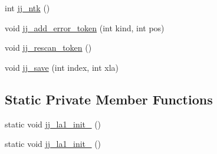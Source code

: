 \begin{DoxyCompactItemize}
\item 
int \hyperlink{classuk_1_1ac_1_1manchester_1_1cs_1_1owl_1_1owlapi_1_1turtle_1_1parser_1_1_turtle_parser_adb6c380d1bc82c2a440a9f7c1c100c7c}{jj\-\_\-ntk} ()
\item 
void \hyperlink{classuk_1_1ac_1_1manchester_1_1cs_1_1owl_1_1owlapi_1_1turtle_1_1parser_1_1_turtle_parser_a344c77321cbb082e5a7cc9f7ccb2f335}{jj\-\_\-add\-\_\-error\-\_\-token} (int kind, int pos)
\item 
void \hyperlink{classuk_1_1ac_1_1manchester_1_1cs_1_1owl_1_1owlapi_1_1turtle_1_1parser_1_1_turtle_parser_a1c81a4de97063594f6558495d9199bfc}{jj\-\_\-rescan\-\_\-token} ()
\item 
void \hyperlink{classuk_1_1ac_1_1manchester_1_1cs_1_1owl_1_1owlapi_1_1turtle_1_1parser_1_1_turtle_parser_af8fc363c196ddb8b764d6b9fb768e7e2}{jj\-\_\-save} (int index, int xla)
\end{DoxyCompactItemize}
\subsection*{Static Private Member Functions}
\begin{DoxyCompactItemize}
\item 
static void \hyperlink{classuk_1_1ac_1_1manchester_1_1cs_1_1owl_1_1owlapi_1_1turtle_1_1parser_1_1_turtle_parser_a7c9c3fa07c2092a6bdd578aa57b1f33f}{jj\-\_\-la1\-\_\-init\-\_} ()
\item 
static void \hyperlink{classuk_1_1ac_1_1manchester_1_1cs_1_1owl_1_1owlapi_1_1turtle_1_1parser_1_1_turtle_parser_adc148db78531c2280570f8f09c5b4864}{jj\-\_\-la1\-\_\-init\-\_} ()
\end{DoxyCompactItemize}
